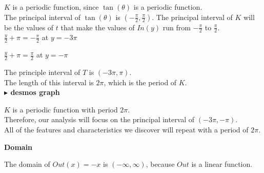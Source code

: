 \documentclass{ximera}
\begin{document}
$K$ is a periodic function, since $\tan(\theta)$ is a periodic function. \\

The principal interval of $\tan(\theta)$ is $\left( -\frac{\pi}{2}, \frac{\pi}{2}  \right)$.  The principal interval of $K$ will be the values of $t$ that make the values of $In(y)$ run from $-\frac{\pi}{2}$ to $\frac{\pi}{2}$. \\


$\frac{y}{2} + \pi = -\frac{\pi}{2}$ at $y = -3\pi$

$\frac{y}{2} + \pi = \frac{\pi}{2}$ at $y = -\pi$

The principle interval of $T$ is $\left( -3\pi, \pi \right)$. \\

The length of this interval is $2\pi$, which is the period of $K$. \\












\textbf{\textcolor{blue!55!black}{$\blacktriangleright$ desmos graph}} 
\begin{center}
\end{center}











\begin{observation}

$K$ is a periodic function with period $2\pi$. \\


Therefore, our analysis will focus on the principal interval of $\left( -3\pi, -\pi \right)$. \\


All of the features and characteristics we discover will repeat with a period of $2\pi$.\\


\end{observation}









\textbf{\textcolor{blue!55!black}{Domain}}


The domain of $Out(x) = -x$ is $(-\infty, \infty)$, because $Out$ is a linear function.  \\
\end{document}
